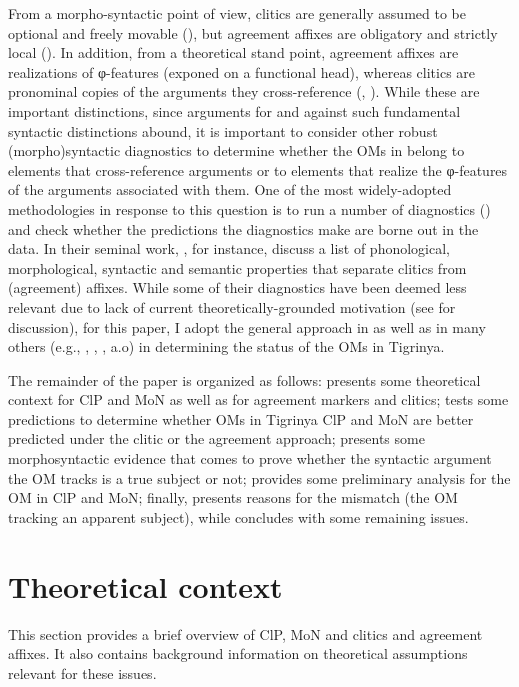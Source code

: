 \documentclass[output=paper]{langscibook}
\begin{document}
\begin{sloppypar}
From a morpho-syntactic point of view, clitics are generally assumed to be optional and freely movable (\citealt{corbett2006}), but agreement affixes are obligatory and strictly local (\citealt{preminger09}). In addition, from a theoretical stand point, agreement affixes are realizations of φ-features (exponed on a functional head), whereas clitics are pronominal copies of the arguments they cross-reference (\citealt{nevins11a}, \citealt{kramer14}). While these are important distinctions, since arguments for and against such fundamental syntactic distinctions abound, it is important to consider other robust (morpho)syntactic diagnostics to determine whether the OMs in  belong to elements that cross-reference arguments or to elements that realize the φ-features of the arguments associated with them.
One of the most widely-adopted methodologies in response to this question is to run a number of diagnostics (\citealt{zwickyandpullum}) and check whether the predictions the diagnostics make are borne out in the data. In their seminal work, \citet{zwickyandpullum}, for instance, discuss a list of phonological, morphological, syntactic and semantic properties that separate clitics from (agreement) affixes. While some of their diagnostics have been deemed less relevant due to lack of current theoretically-grounded motivation (see \citealt{nevins11a} for discussion), for this paper, I adopt the general approach in \citet{zwickyandpullum} as well as in many others (e.g., \citealt{kramer14}, \citealt{oxford14}, \citealt{compton16}, a.o) in determining the status of the OMs in Tigrinya. 
\end{sloppypar}

The remainder of the paper is organized as follows:  presents some theoretical context for ClP and MoN as well as for agreement markers and clitics;  tests some predictions to determine whether OMs in Tigrinya ClP and MoN are better predicted under the clitic or the agreement approach;  presents some morphosyntactic evidence that comes to prove whether the syntactic argument the OM tracks is a true subject or not;  provides some preliminary analysis for the OM in ClP and MoN; finally,  presents reasons for the mismatch (the OM tracking an apparent subject), while  concludes with some remaining issues. 

\section{Theoretical context}\label{sec:gebregziabher:2}
This section provides a brief overview of ClP, MoN and clitics and agreement affixes. It also contains background information on theoretical assumptions relevant for these issues. 
\end{document}

